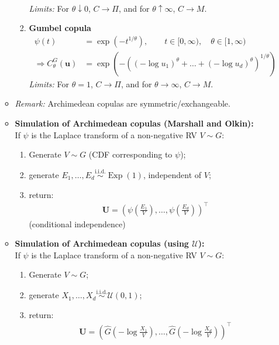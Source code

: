 \documentclass[a4paper,landscape,8pt,fleqn]{scrartcl}
\renewcommand{\emph}[1]{\textbf{#1}}
\DeclareMathOperator{\Exp}{Exp}				%
\begin{document}
\begin{multicols*}{3}
\begin{itemize}
\begin{itemize}
\begin{enumerate}
\begin{align*}
\end{align*}
\textit{Limits:} For $\theta \downarrow 0$, $C \to \Pi$, and for $\theta \uparrow \infty$, $C \to M$.
\item \emph{Gumbel copula}
\begin{align*}
\psi(t) &= \exp(-t^{1/\theta}), \qquad t \in [0, \infty), \quad \theta \in [1, \infty) \\
\Rightarrow C_\theta^G(\bm u) &= \exp \left( -\left( (-\log u_1)^\theta + \ldots + (-\log u_d)^\theta \right)^{1/\theta} \right)
\end{align*}
\textit{Limits:} For $\theta=1$, $C \to \Pi$, and for $\theta \to \infty$, $C \to M$.
\end{enumerate}
\item \textit{Remark:} Archimedean copulas are symmetric/exchangeable.
\item \emph{Simulation of Archimedean copulas (Marshall and Olkin):} \\
If $\psi$ is the Laplace transform of a non-negative RV $V \sim G$:
\begin{enumerate}
\item Generate $V \sim G$ (CDF corresponding to $\psi$);
\item generate $E_1, \ldots, E_d \overset{\text{i.i.d.}}{\sim} \Exp(1)$, independent of $V$;
\item return:
\begin{align*}
\bm U = \left( \psi \left( \frac{E_1}{V} \right), \ldots, \psi \left( \frac{E_d}{V} \right) \right)^\top
\end{align*}
(conditional independence)
\end{enumerate}
\item \emph{Simulation of Archimedean copulas (using $\mathcal{U}$):} \\
If $\psi$ is the Laplace transform of a non-negative RV $V \sim G$:
\begin{enumerate}
\item Generate $V \sim G$;
\item generate $X_1, \ldots, X_d \overset{\text{i.i.d.}}{\sim} \mathcal{U}(0,1)$;
\item return:
\begin{align*}
\bm U = \left( \hat G \left( -\log \frac{X_1}{V} \right), \ldots, \hat G \left( -\log \frac{X_d}{V} \right) \right)^\top
\end{align*}
\end{enumerate}
\end{itemize}
\end{itemize}


\end{multicols*}
\end{document}
